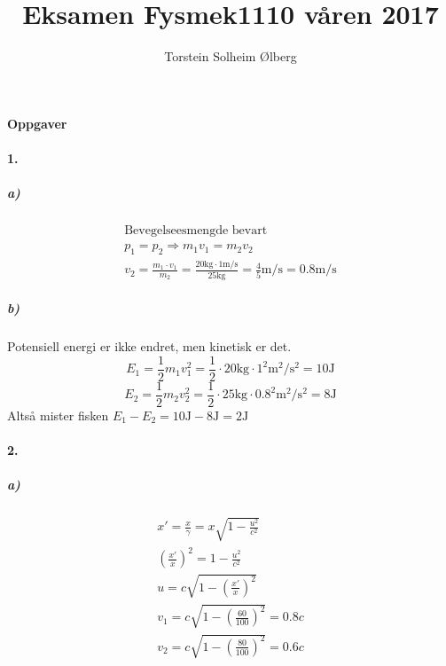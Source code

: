 \documentclass[11pt, A4paper,norsk]{article}
\author{Torstein Solheim Ølberg}
\title{Eksamen Fysmek1110 våren 2017}
\begin{document}
\maketitle
	\begin{center}
\Large \textbf{Oppgaver}
	\end{center}









		\paragraph{1.}
			\subparagraph{a)}
				\begin{gather*}
\text{Bevegelseesmengde bevart} \\
p_1 = p_2 \Rightarrow m_1 v_1 = m_2 v_2 \\
v_2 = \frac{m_1 \cdot v_1}{m_2} = \frac{20 \text{kg} \cdot 1 \text{m$/$s}}{25 \text{kg}} = \frac{4}{5} \text{m$/$s} = 0.8 \text{m$/$s}
				\end{gather*}









			\subparagraph{b)}
				\begin{flushleft}
Potensiell energi er ikke endret, men kinetisk er det.
$$E_1 = \frac{1}{2} m_1 v_1^2 = \frac{1}{2} \cdot 20 \text{kg} \cdot 1^2 \text{m$^2/$s$^2$} = 10 \text{J}$$
$$E_2 = \frac{1}{2} m_2 v_2^2 = \frac{1}{2} \cdot 25 \text{kg} \cdot 0.8^2 \text{m$^2/$s$^2$} = 8 \text{J}$$
Altså mister fisken $E_1 - E_2 = 10 \text{J} - 8 \text{J} = 2 \text{J}$
				\end{flushleft}

			








		\paragraph{2.}
			\subparagraph{a)}
				\begin{gather*}
x' = \frac{x}{\gamma} = x \sqrt{1 - \frac{u^2}{c^2}} \\
\left( \frac{x'}{x} \right)^2 = 1 - \frac{u^2}{c^2} \\
u = c \sqrt{1 - \left( \frac{x'}{x} \right)^2} \\
v_1 = c \sqrt{1 - \left( \frac{60}{100} \right)^2} = 0.8c \\
v_2 = c \sqrt{1 - \left( \frac{80}{100} \right)^2} = 0.6c
				\end{gather*}
\end{document}
